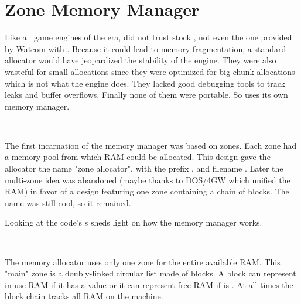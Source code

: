 \section{Zone Memory Manager}
Like all game engines of the era, \doom{} did not trust stock , not even the one provided by Watcom with . Because it could lead to memory fragmentation, a standard allocator would have jeopardized the stability of the engine. They were also wasteful for small allocations since they were optimized for big chunk allocations which is not what the engine does. They lacked good debugging tools to track leaks and buffer overflows. Finally none of them were portable. So \doom{} uses its own memory manager.\\
\par

\\
\par
The first incarnation of the memory manager was based on zones. Each zone had a memory pool from which RAM could be allocated. This design gave the allocator the name "zone allocator", with the prefix , and filename . Later the multi-zone idea was abandoned (maybe thanks to DOS/4GW which unified the RAM) in favor of a design featuring one zone containing a chain of blocks. The  name was still cool, so it remained.\\
\par
Looking at the code's s sheds light on how the memory manager works.\\
\par
{}\\
\par
The memory allocator uses only one zone for the entire available RAM. This "main" zone is a doubly-linked circular list made of blocks. A block can represent in-use RAM if it has a  value or it can represent free RAM if  is . At all times the block chain tracks all RAM on the machine.



